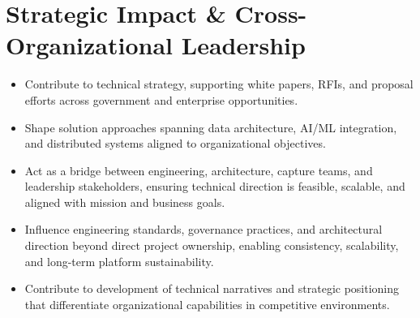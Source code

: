 \section{Strategic Impact \& Cross-Organizational Leadership}

\begin{itemize}
    \item Contribute to technical strategy, supporting white papers, RFIs, and proposal efforts across government and enterprise opportunities.
    \item Shape solution approaches spanning data architecture, AI/ML integration, and distributed systems aligned to organizational objectives.
    \item Act as a bridge between engineering, architecture, capture teams, and leadership stakeholders, ensuring technical direction is feasible, scalable, and aligned with mission and business goals.
    \item Influence engineering standards, governance practices, and architectural direction beyond direct project ownership, enabling consistency, scalability, and long-term platform sustainability.
    \item Contribute to development of technical narratives and strategic positioning that differentiate organizational capabilities in competitive environments.
\end{itemize}
